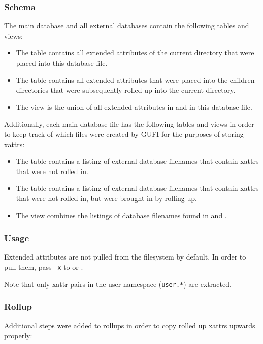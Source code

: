 \subsubsection{Schema}
\label{sec:xattr_schema}
The main database and all external databases contain the following
tables and views:

\begin{itemize}
\item The \xattrspwd table contains all extended attributes of the
  current directory that were placed into this database file.

\item The \xattrsrollup table contains all extended attributes that
  were placed into the children directories that were subsequently
  rolled up into the current directory.

\item The \xattrsavail view is the union of all extended attributes
  in \xattrspwd and \xattrsrollup in this database file.
\end{itemize}

Additionally, each main database file has the following tables and
views in order to keep track of which files were created by GUFI for
the purposes of storing xattrs:

\begin{itemize}
\item The \xattrfilespwd table contains a listing of external database
  filenames that contain xattrs that were not rolled in.
\item The \xattrfilesrollup table contains a listing of external
  database filenames that contain xattrs that were not
  rolled in, but were brought in by rolling up.
\item The \xattrfiles view combines the listings of database filenames
  found in \xattrfilespwd and \xattrfilesrollup.
\end{itemize}

\subsubsection{Usage}
Extended attributes are not pulled from the filesystem by default. In
order to pull them, pass \texttt{-x} to \gufidirindex or
\gufidirtrace.

Note that only xattr pairs in the user namespace (\texttt{user.*}) are
extracted.

\subsubsection{Rollup}
Additional steps were added to rollups in order to copy rolled up
xattrs upwards properly:

